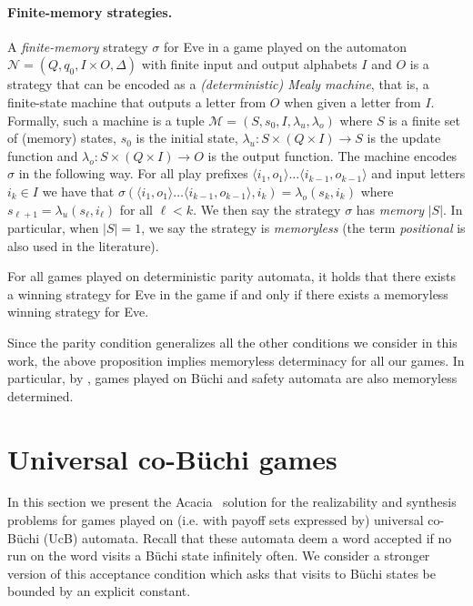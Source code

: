 \documentclass[runningheads,a4paper,draft]{llncs}
\newcommand{\eve}{Eve\xspace}
\newcommand{\calN}{\mathcal{N}}
\newcommand{\calM}{\mathcal{M}}
\begin{document}
\paragraph{Finite-memory strategies.}
A \emph{finite-memory} strategy $\sigma$ for \eve in a game played on the
automaton $\calN = (Q,q_0,I \times O,\Delta)$ with finite input and output
alphabets $I$ and $O$ is a strategy that can be encoded as a
\emph{(deterministic) Mealy machine}, that is, a finite-state machine that
outputs a letter from \(O\) when given a letter from \(I\).  Formally, such a
machine is a tuple $\calM = (S,s_0,I, \lambda_u,\lambda_o)$ where $S$ is a
finite set of (memory) states, $s_0$ is the initial state,
$\lambda_u\colon S \times (Q \times I) \to S$ is the update function and
$\lambda_o\colon S \times (Q \times I) \to O$ is the output function. The
machine encodes $\sigma$ in the following way. For all play prefixes
$\langle i_1, o_1\rangle \dots \langle i_{k-1}, o_{k-1} \rangle$ and input
letters $i_k \in I$ we have that
$\sigma(\langle i_1, o_1\rangle \dots \langle i_{k-1}, o_{k-1} \rangle, i_k) =
\lambda_o(s_k,i_k)$ where $s_{\ell + 1} = \lambda_u(s_\ell,i_\ell)$ for all
$\ell < k$. We then say the strategy $\sigma$ has \emph{memory} $|S|$. In
particular, when $|S| = 1$, we say the strategy is \emph{memoryless} (the term
\emph{positional} is also used in the literature).

\begin{proposition}
  \label{prop:det}%
  For all games played on deterministic parity automata, it holds that there
  exists a winning strategy for \eve in the game if and only if there exists a
  memoryless winning strategy for \eve.
\end{proposition}
Since the parity condition generalizes all the other conditions we consider in
this work, the above proposition implies memoryless determinacy for all our
games.  In particular, by , games played on Büchi and safety
automata are also memoryless determined.

\section{Universal co-B\"uchi games}
In this section we present the Acacia~\cite{acacia} solution for the
realizability and synthesis problems for games played on (i.e. with payoff sets
expressed by) universal co-B\"uchi (UcB) automata.  Recall that these automata
deem a word accepted if no run on the word visits a B\"uchi state infinitely
often.  We consider a stronger version of this acceptance condition which asks
that visits to B\"uchi states be bounded by an explicit constant.
\end{document}
